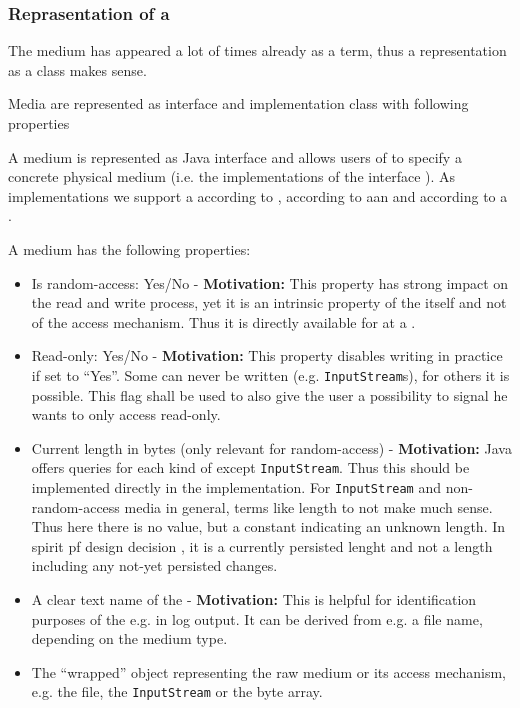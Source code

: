 
\subsubsection{Reprasentation of a  \TERMmedium{}}
\label{sec:RepraesentationEinesTERMmedium}

The medium has appeared a lot of times already as a term, thus a representation as a class makes sense.

{%
Media are represented as interface and implementation class with following properties
}
{%
A medium is represented as Java interface \IMedium{} and allows users of \LibName{} to specify a concrete physical medium (i.e. the implementations of the interface \IMedium{}). As implementations we support a \FileMedium{} according to , according to  aan \InputStreamMedium{} and according to  a \InMemoryMedium{}.

A medium has the following properties:
\begin{itemize}
\item Is random-access: Yes/No \-- \textbf{Motivation:} This property has strong impact on the read and write process, yet it is an intrinsic property of the \TERMmedium{} itself and not of the access mechanism. Thus it is directly available for at a \TERMmedium{}.
\item Read-only: Yes/No \-- \textbf{Motivation:} This property disables writing in practice if set to ``Yes''. Some \TERMmedia{} can never be written (e.g. \texttt{InputStream}s), for others it is possible. This flag shall be used to also give the \LibName{} user a possibility to signal he wants to only access read-only.
\item Current length in bytes (only relevant for random-access) \-- \textbf{Motivation:} Java offers queries for each kind of \IMedium{} except \texttt{InputStream}. Thus this should be implemented directly in the \IMedium{} implementation. For \texttt{InputStream} and non-random-access media in general, terms like length to not make much sense. Thus here there is no value, but a constant indicating an unknown length. In spirit pf design decision , it is a currently persisted lenght and not a length including any not-yet persisted changes.
\item A clear text name of the \TERMmedium{} \-- \textbf{Motivation:} This is helpful for identification purposes of the \IMedium{} e.g. in log output. It can be derived from e.g. a file name, depending on the medium type.
\item The ``wrapped'' object representing the raw medium or its access mechanism, e.g. the file, the \texttt{InputStream} or the byte array.
\end{itemize}
}
